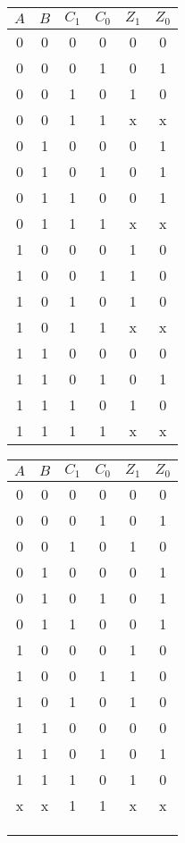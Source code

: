 \begin{minipage}[t]{1.85in}
\begin{tabular}{cccc|cc}
$A$& $B$& $C_1$& $C_0$& $Z_1$& $Z_0$\\ \hline
0& 0& 0& 0& 0& 0\\
0& 0& 0& 1& 0& 1\\
0& 0& 1& 0& 1& 0\\
0& 0& 1& 1& x& x\\ \hline
0& 1& 0& 0& 0& 1\\
0& 1& 0& 1& 0& 1\\
0& 1& 1& 0& 0& 1\\
0& 1& 1& 1& x& x\\ \hline
1& 0& 0& 0& 1& 0\\
1& 0& 0& 1& 1& 0\\
1& 0& 1& 0& 1& 0\\
1& 0& 1& 1& x& x\\ \hline
1& 1& 0& 0& 0& 0\\
1& 1& 0& 1& 0& 1\\
1& 1& 1& 0& 1& 0\\
1& 1& 1& 1& x& x
\end{tabular}
\end{minipage}\hspace{.35in}%
\begin{minipage}{1.85in}
\begin{tabular}{cccc|cc}
$A$& $B$& $C_1$& $C_0$& $Z_1$& $Z_0$\\ \hline
0& 0& 0& 0& 0& 0\\
0& 0& 0& 1& 0& 1\\
0& 0& 1& 0& 1& 0\\ \hline
0& 1& 0& 0& 0& 1\\
0& 1& 0& 1& 0& 1\\
0& 1& 1& 0& 0& 1\\ \hline
1& 0& 0& 0& 1& 0\\
1& 0& 0& 1& 1& 0\\
1& 0& 1& 0& 1& 0\\ \hline
1& 1& 0& 0& 0& 0\\
1& 1& 0& 1& 0& 1\\
1& 1& 1& 0& 1& 0\\ \hline
x& x& 1& 1& x& x\\
\\ \\ \\
\end{tabular}\vfill
\end{minipage}\hspace{.35in}%
